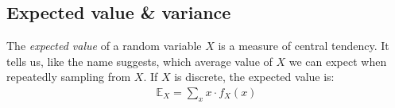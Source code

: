\documentclass[nobib,nofonts]{tufte-handout}
\renewcommand{\markdef}[1]{\emph{#1}}
\newcommand{\mult}{\ensuremath{\cdot}}
\begin{document}




\subsection{Expected value \& variance}

The \markdef{expected value} of a random variable $X$ is a measure of central tendency.
It tells us, like the name suggests, which average value of $X$ we can expect when repeatedly sampling from $X$.
If $X$ is discrete, the expected value is:
\begin{align*}
  \mathds{E}_X = \sum_{x} x \mult f_X(x)
\end{align*}
\end{document}

